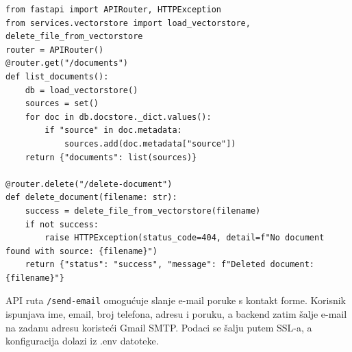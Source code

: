 \documentclass[]{foi}
\begin{document}
\begin{longlisting}
\begin{verbatim}
from fastapi import APIRouter, HTTPException
from services.vectorstore import load_vectorstore, delete_file_from_vectorstore
router = APIRouter()
@router.get("/documents")
def list_documents():
    db = load_vectorstore()
    sources = set()
    for doc in db.docstore._dict.values():
        if "source" in doc.metadata:
            sources.add(doc.metadata["source"])
    return {"documents": list(sources)}

@router.delete("/delete-document")
def delete_document(filename: str):
    success = delete_file_from_vectorstore(filename)
    if not success:
        raise HTTPException(status_code=404, detail=f"No document found with source: {filename}")
    return {"status": "success", "message": f"Deleted document: {filename}"}
\end{verbatim}
\caption{documents.py}
\label{lst:documents}
\end{longlisting}

API ruta \verb|/send-email| omogućuje slanje e-mail poruke s kontakt forme. Korisnik ispunjava ime, email, broj telefona, adresu i poruku, a backend
zatim šalje e-mail na zadanu adresu koristeći Gmail SMTP. Podaci se šalju putem SSL-a, a konfiguracija dolazi iz .env datoteke.
\end{document}
